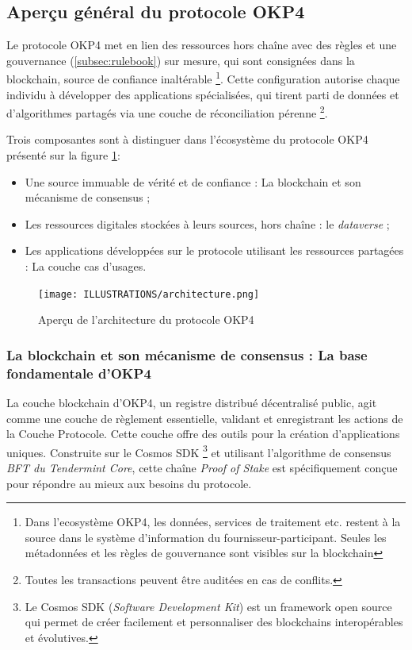 \subsection{Aperçu général du protocole OKP4}\label{subsec:aperçu_general_protocol}


Le protocole OKP4 met en lien des ressources hors chaîne avec des règles et une gouvernance (\ref{subsec:rulebook}) sur mesure, qui sont consignées dans la blockchain, source de confiance inaltérable \footnote{Dans l'ecosystème OKP4, les données, services de traitement etc. restent à la source dans le système d'information du fournisseur-participant. Seules les métadonnées et les règles de gouvernance sont visibles sur la blockchain}. Cette configuration autorise chaque individu à développer des applications spécialisées, qui tirent parti de données et d'algorithmes partagés via une couche de réconciliation pérenne \footnote{Toutes les transactions peuvent être auditées en cas de conflits.}.

Trois composantes sont à distinguer dans l'écosystème du protocole OKP4 présenté sur la figure \ref{fig:architecture_protocole}:
\begin{itemize}
    \item Une source immuable de vérité et de confiance : La blockchain et son mécanisme de consensus ;
    \item Les ressources digitales stockées à leurs sources, hors chaîne : le \textit{dataverse} ;
    \item Les applications développées sur le protocole utilisant les ressources partagées : La couche cas d'usages.
\end{itemize}

\begin{figure}[h]
    \centering
    \texttt{[image: ILLUSTRATIONS/architecture.png]}
    \caption{Aperçu de l'architecture du protocole OKP4}
    \label{fig:architecture_protocole}
\end{figure}

\subsubsection{La blockchain et son mécanisme de consensus : La base fondamentale d'OKP4} \label{subsubsec:apercu_bc_consensus_okp4}


La couche blockchain d'OKP4, un registre distribué décentralisé public, agit comme une couche de règlement essentielle, validant et enregistrant les actions de la Couche Protocole. Cette couche offre des outils pour la création d'applications uniques. Construite sur le Cosmos SDK \footnote{Le Cosmos SDK (\textit{Software Development Kit}) est un framework open source qui permet de créer facilement et personnaliser des blockchains interopérables et évolutives.} et utilisant l'algorithme de consensus \textit{BFT du Tendermint Core}, cette chaîne \textit{Proof of Stake} est spécifiquement conçue pour répondre au mieux aux besoins du protocole.

